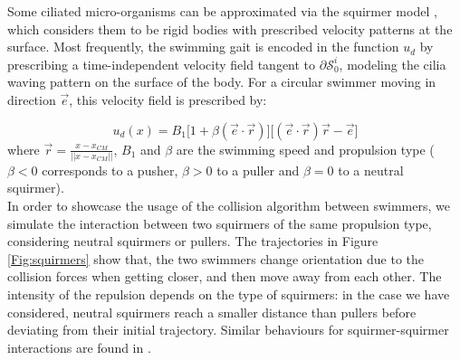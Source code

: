 \documentclass[graybox]{svmult}
\newcommand{\Solid}{\mathcal{S}} %
\begin{document}
Some ciliated micro-organisms can be approximated via the squirmer model \cite{blake_spherical_1971,lighthill_squirming_1952}, which considers them to be rigid bodies with prescribed velocity patterns at the surface. Most frequently, the swimming gait is encoded in the function $u_d$ by prescribing a time-independent velocity field tangent to $\partial \Solid_0^i$, modeling the cilia waving pattern on the surface of the body. For a circular swimmer moving in direction $\overrightarrow{e}$, this velocity field is prescribed by:

$$
u_d(x) =  B_1 \Bigg[ 1 + \beta (\overrightarrow{e} \cdot \overrightarrow{r}) \Bigg] \Bigg[(\overrightarrow{e} \cdot \overrightarrow{r})\overrightarrow{r} - \overrightarrow{e} \Bigg]
$$ 
where  $ \overrightarrow{r} = \frac{x - x_{CM}} {||x - x_{CM}||} $, $B_1$ and $\beta$ are the swimming speed and propulsion type ( $\beta < 0$ corresponds to a pusher, $\beta > 0$ to a puller and $\beta = 0$ to a neutral squirmer).\\
In order to showcase the usage of the collision algorithm between swimmers, we simulate the interaction between two squirmers of the same propulsion type, considering neutral squirmers or pullers. The trajectories in Figure \ref{Fig:squirmers} show that, the two swimmers change orientation due to the collision forces when getting closer, and then move away from each other.
The intensity of the repulsion depends on the type of squirmers: in the case we have considered, neutral squirmers reach a smaller distance than pullers before deviating from their initial trajectory. Similar behaviours for squirmer-squirmer interactions are found in \cite{ishikawa_hydrodynamic_2006}. 
\end{document}
